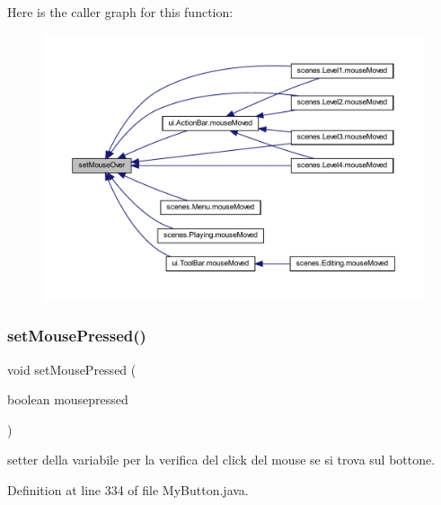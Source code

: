 Here is the caller graph for this function\+:\nopagebreak
\begin{figure}[H]
\begin{center}
\leavevmode
\includegraphics[width=350pt]{classui_1_1_my_button_ac3f48a7245ffa1fe24d32ea71797997d_icgraph}
\end{center}
\end{figure}
\mbox{\label{classui_1_1_my_button_a773d9d0a3424f8007205c7011f69c723}} 
\subsubsection{\texorpdfstring{set\+Mouse\+Pressed()}{setMousePressed()}}
{\footnotesize\ttfamily void set\+Mouse\+Pressed (\begin{DoxyParamCaption}\item[{boolean}]{mousepressed }\end{DoxyParamCaption})}



setter della variabile per la verifica del click del mouse se si trova sul bottone. 



Definition at line 334 of file My\+Button.\+java.


